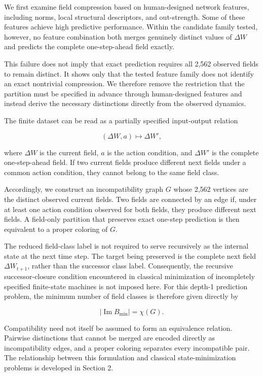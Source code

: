 \documentclass[
  11pt,
]{article}
\begin{document}
We first examine field compression based on human-designed network
features, including norms, local structural descriptors, and
out-strength. Some of these features achieve high predictive
performance. Within the candidate family tested, however, no feature
combination both merges genuinely distinct values of \({\Delta W}\) and
predicts the complete one-step-ahead field exactly.

This failure does not imply that exact prediction requires all 2,562
observed fields to remain distinct. It shows only that the tested
feature family does not identify an exact nontrivial compression. We
therefore remove the restriction that the partition must be specified in
advance through human-designed features and instead derive the necessary
distinctions directly from the observed dynamics.

The finite dataset can be read as a partially specified input-output
relation

\[{(\Delta W,a)\longmapsto\Delta W',}\]

where \({\Delta W}\) is the current field, \({a}\) is the action
condition, and \({\Delta W'}\) is the complete one-step-ahead field. If
two current fields produce different next fields under a common action
condition, they cannot belong to the same field class.

Accordingly, we construct an incompatibility graph \({G}\) whose 2,562
vertices are the distinct observed current fields. Two fields are
connected by an edge if, under at least one action condition observed
for both fields, they produce different next fields. A field-only
partition that preserves exact one-step prediction is then equivalent to
a proper coloring of \({G}\).

The reduced field-class label is not required to serve recursively as
the internal state at the next time step. The target being preserved is
the complete next field \({\Delta W_{t+1}}\), rather than the successor
class label. Consequently, the recursive successor-closure condition
encountered in classical minimization of incompletely specified
finite-state machines is not imposed here. For this depth-1 prediction
problem, the minimum number of field classes is therefore given directly
by

\[{|\operatorname{Im}B_{\min}|=\chi(G).}\]

Compatibility need not itself be assumed to form an equivalence
relation. Pairwise distinctions that cannot be merged are encoded
directly as incompatibility edges, and a proper coloring separates every
incompatible pair. The relationship between this formulation and
classical state-minimization problems is developed in Section 2.
\end{document}
